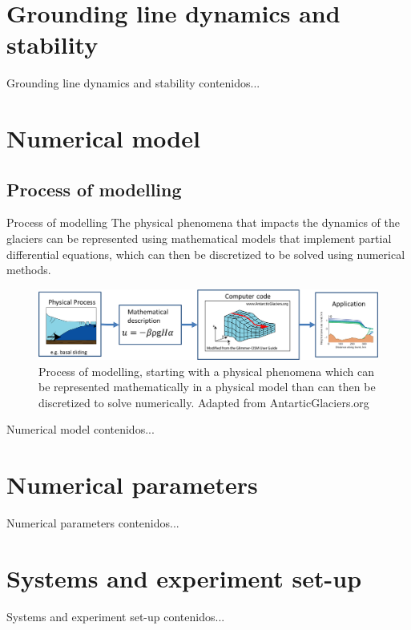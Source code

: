 \documentclass[11pt]{beamer}
\begin{document}
	\section{Grounding line dynamics and stability}
		\begin{frame}{Grounding line dynamics and stability}
		contenidos...
		\end{frame}

	\section{Numerical model}
	\subsection{Process of modelling}
	\begin{frame}{Process of modelling}
		\justifying
		The physical phenomena that impacts the dynamics of the glaciers can be represented using mathematical models that implement partial differential equations, which can then be discretized to be solved using numerical methods.
		\begin{figure}
			\centering
			\includegraphics[scale=0.4]{../fig/Numerical_modelling_scheme.png}
			\caption{Process of modelling, starting with a physical phenomena which can be represented mathematically in a physical model than can then be discretized to solve numerically. Adapted from AntarticGlaciers.org}
			\label{Modelling}
		\end{figure}
	\end{frame}
		\begin{frame}{Numerical model}
		contenidos...
		\end{frame}
	\section{Numerical parameters}
		\begin{frame}{Numerical parameters}
		contenidos...
		\end{frame}
	\section{Systems and experiment set-up}
		\begin{frame}{Systems and experiment set-up}
		contenidos...
		\end{frame}
\end{document}
